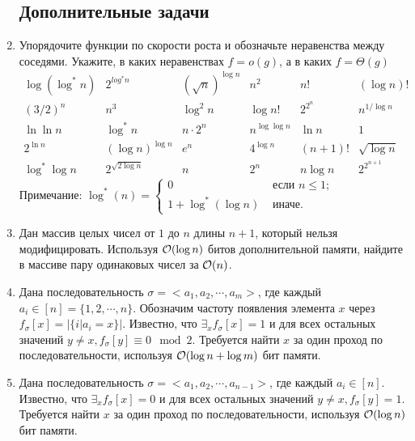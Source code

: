 \begin{enumerate}
	
	
\subsection{Дополнительные задачи}

  \item
    Упорядочите функции по скорости роста и обозначьте неравенства между соседями. 
    Укажите, в каких неравенствах $f = o(g)$, а в каких $f = \Theta(g)$
	$$
		\begin{array}{cccccc}
			\log(\log^* n) & 2^{log^* n} & (\sqrt{n})^{\log n} & n^2 & n! & (\log n)! \\
			(3 \slash 2)^n & n^3 & \log^2 n & \log n! & 2^{2^n} & n^{1 \slash \log n} \\
			\ln \ln n & \log^* n & n \cdot 2^n & n^{\log \log n} & \ln n & 1 \\
			2^{\ln n} & (\log n)^{\log n} & e^n & 4^{\log n} & (n + 1)! & \sqrt{\log n} \\
			\log^* \log n & 2^{\sqrt{2 \log n}} & n & 2^n & n \log n & 2^{2^{n + 1}}					
		\end{array}
	$$
    Примечание: $\log^*(n) = \left\{
    \begin{array}{ll}
        0 & \texttt{ если } n \leq 1;\\
        1 + \log^*(\log n) & \texttt{ иначе.}
    \end{array}
    \right.$

  \item
    Дан массив целых чисел от $1$ до $n$ длины $n + 1$, который нельзя модифицировать. Используя $\mathcal{O}(\log{n})$ битов
    дополнительной памяти, найдите в массиве пару одинаковых чисел за $\mathcal{O}(n)$.

  \item Дана последовательность $\sigma = <a_1, a_2, \cdots, a_m>$,
    где каждый $a_i \in [n] = \{1,2,\cdots,n\}$. Обозначим частоту
    появления элемента $x$ через $f_{\sigma}[x] = \left|\{i | a_i =
    x\}\right|$. Известно, что $\exists_x f_\sigma[x] = 1$ и для всех
    остальных значений $y \ne x, f_\sigma[y] \equiv 0 \mod
    2$. Требуется найти $x$ за один проход по последовательности,
    используя $\mathcal{O}(\log{n} + \log{m})$ бит памяти.

  \item Дана последовательность $\sigma = <a_1, a_2, \cdots,
    a_{n-1}>$, где каждый $a_i \in [n]$. Известно, что $\exists_x
    f_\sigma[x] = 0$ и для всех остальных значений $y \ne x,
    f_\sigma[y] = 1$. Требуется найти $x$ за один проход по
    последовательности, используя $\mathcal{O}(\log{n})$ бит памяти.


\end{enumerate}
